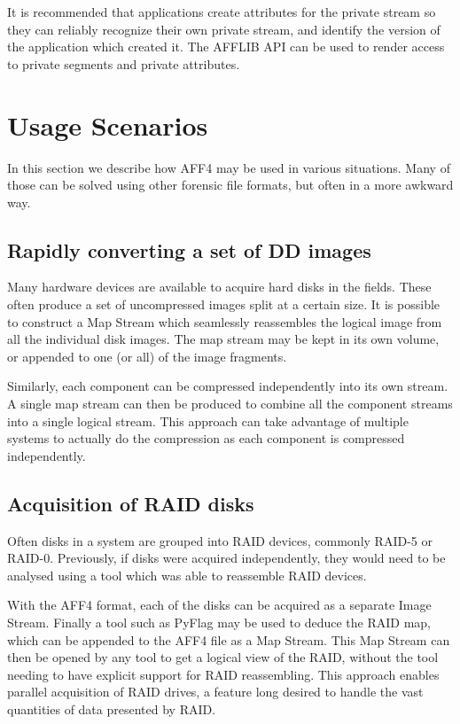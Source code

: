 \documentclass[10pt, conference]{IEEEtran}
\begin{document}
It is recommended that applications create attributes for the private
stream so they can reliably recognize their own private stream, and
identify the version of the application which created it. The AFFLIB
API can be used to render access to private segments and private
attributes.

\section{Usage Scenarios}
In this section we describe how AFF4 may be used in various
situations. Many of those can be solved using other forensic file
formats, but often in a more awkward way.

\subsection{Rapidly converting a set of DD images}
Many hardware devices are available to acquire hard disks in the
fields. These often produce a set of uncompressed images split at a
certain size. It is possible to construct a Map Stream which
seamlessly reassembles the logical image from all the individual disk
images. The map stream may be kept in its own volume, or appended to
one (or all) of the image fragments.

Similarly, each component can be compressed independently into its own
stream. A single map stream can then be produced to combine all the
component streams into a single logical stream. This approach can take
advantage of multiple systems to actually do the compression as each
component is compressed independently.

\subsection{Acquisition of RAID disks}
Often disks in a system are grouped into RAID devices, commonly RAID-5
or RAID-0. Previously, if disks were acquired independently, they
would need to be analysed using a tool which was able to reassemble
RAID devices.

With the AFF4 format, each of the disks can be acquired as a separate
Image Stream. Finally a tool such as PyFlag \cite{pyflag_raid} may be
used to deduce the RAID map, which can be appended to the AFF4 file as
a Map Stream. This Map Stream can then be opened by any tool to get a
logical view of the RAID, without the tool needing to have explicit
support for RAID reassembling. This approach enables parallel
acquisition of RAID drives, a feature long desired to handle the vast
quantities of data presented by RAID.
\end{document}
